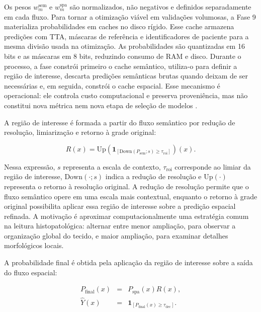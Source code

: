 Os pesos $w_m^{\mathrm{sem}}$ e $w_m^{\mathrm{spa}}$ são normalizados,
não negativos e definidos separadamente em cada fluxo. Para tornar a otimização viável em validações volumosas, a Fase 9 materializa probabilidades em caches no disco rígido. Esse cache armazena predições
com TTA, máscaras de referência e identificadores de paciente para a mesma
divisão usada na otimização. As probabilidades são quantizadas em 16 bits e as
máscaras em 8 bits, reduzindo consumo de RAM e disco. Durante o processo, a
fase constrói primeiro o cache semântico, utiliza-o para definir a região de
interesse, descarta predições semânticas brutas quando deixam de ser necessárias
e, em seguida, constrói o cache espacial. Esse mecanismo é operacional: ele
controla custo computacional e preserva proveniência, mas não constitui nova
métrica nem nova etapa de seleção de modelos
\cite{wilkinson2016fair,piccolo2016tools}.

A região de interesse é formada a partir do fluxo semântico por redução de
resolução, limiarização e retorno à grade original:

\begin{equation}
    R(x)=
    \mathrm{Up}
    \left(
    \mathbf{1}_{[
    \mathrm{Down}(P_{\mathrm{sem}};s)\ge\tau_{\mathrm{roi}}
    ]}
    \right)(x).
    \label{eq:roi_gate}
\end{equation}

Nessa expressão, $s$ representa a escala de contexto, $\tau_{\mathrm{roi}}$
corresponde ao limiar da região de interesse, $\mathrm{Down}(\cdot;s)$ indica a
redução de resolução e $\mathrm{Up}(\cdot)$ representa o retorno à resolução
original. A redução de resolução permite que o fluxo semântico opere em uma
escala mais contextual, enquanto o retorno à grade original possibilita aplicar
essa região de interesse sobre a predição espacial refinada. A motivação é aproximar computacionalmente uma estratégia comum na leitura
histopatológica: alternar entre menor ampliação, para observar a organização
global do tecido, e maior ampliação, para examinar detalhes morfológicos locais.

A probabilidade final é obtida pela aplicação da região de interesse sobre a
saída do fluxo espacial:

\begin{equation}
\begin{array}{rcl}
P_{\mathrm{final}}(x) &=& P_{\mathrm{spa}}(x)R(x),\\[0.5em]
\hat{Y}(x) &=& \mathbf{1}_{[P_{\mathrm{final}}(x)\ge\tau_{\mathrm{dec}}]}.
\end{array}
\label{eq:final_gated_prediction}
\end{equation}

